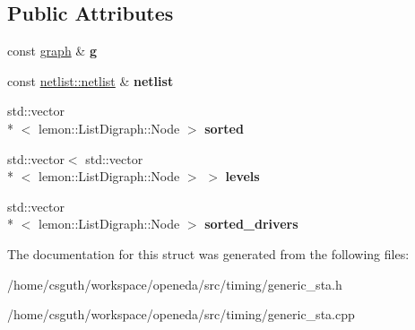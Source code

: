 \subsection*{Public Attributes}
\begin{DoxyCompactItemize}
\item 
\hypertarget{structophidian_1_1timing_1_1graph__and__topology_a782bda4d0a09ae4df746e2a5be93fcf1}{const \hyperlink{classophidian_1_1timing_1_1graph}{graph} \& {\bfseries g}}\label{structophidian_1_1timing_1_1graph__and__topology_a782bda4d0a09ae4df746e2a5be93fcf1}

\item 
\hypertarget{structophidian_1_1timing_1_1graph__and__topology_aab364388e8bb4a22397f27d46798cd99}{const \hyperlink{classophidian_1_1netlist_1_1netlist}{netlist\-::netlist} \& {\bfseries netlist}}\label{structophidian_1_1timing_1_1graph__and__topology_aab364388e8bb4a22397f27d46798cd99}

\item 
\hypertarget{structophidian_1_1timing_1_1graph__and__topology_a49bcee6d055c958796984c19e10aa691}{std\-::vector\\*
$<$ lemon\-::\-List\-Digraph\-::\-Node $>$ {\bfseries sorted}}\label{structophidian_1_1timing_1_1graph__and__topology_a49bcee6d055c958796984c19e10aa691}

\item 
\hypertarget{structophidian_1_1timing_1_1graph__and__topology_a44d63c4dc19d5a0fbc2f835494af2179}{std\-::vector$<$ std\-::vector\\*
$<$ lemon\-::\-List\-Digraph\-::\-Node $>$ $>$ {\bfseries levels}}\label{structophidian_1_1timing_1_1graph__and__topology_a44d63c4dc19d5a0fbc2f835494af2179}

\item 
\hypertarget{structophidian_1_1timing_1_1graph__and__topology_a209197e9025a93f98aa9795570d3973f}{std\-::vector\\*
$<$ lemon\-::\-List\-Digraph\-::\-Node $>$ {\bfseries sorted\-\_\-drivers}}\label{structophidian_1_1timing_1_1graph__and__topology_a209197e9025a93f98aa9795570d3973f}

\end{DoxyCompactItemize}


The documentation for this struct was generated from the following files\-:\begin{DoxyCompactItemize}
\item 
/home/csguth/workspace/openeda/src/timing/generic\-\_\-sta.\-h\item 
/home/csguth/workspace/openeda/src/timing/generic\-\_\-sta.\-cpp\end{DoxyCompactItemize}
